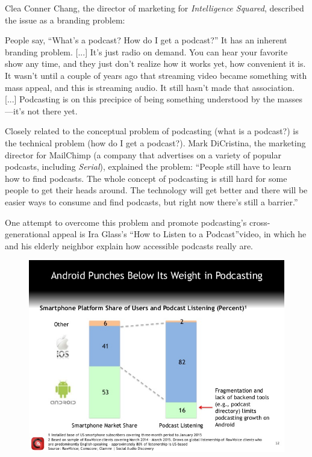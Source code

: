 \documentclass[notoc, symmetric, nobib, nols]{towcenter-guideto-book}
\begin{document}
Clea Conner Chang, the director of marketing for \textit{Intelligence Squared}, described the issue as a branding problem: 

People say, ``What's a podcast? How do I get a podcast?'' It has an inherent branding problem. [...] It's just radio on demand. You can hear your favorite show any time, and they just don't realize how it works yet, how convenient it is. It wasn't until a couple of years ago that streaming video became something with mass appeal, and this is streaming audio. It still hasn't made that association. [...] Podcasting is on this precipice of being something understood by the masses---it's not there yet.\autocite{chang} 

Closely related to the conceptual problem of podcasting (what is a podcast?) is the technical problem (how do I get a podcast?). Mark DiCristina, the marketing director for MailChimp (a company that advertises on a variety of popular podcasts, including \textit{Serial}), explained the problem: ``People still have to learn how to find podcasts. The whole concept of podcasting is still hard for some people to get their heads around. The technology will get better and there will be easier ways to consume and find podcasts, but right now there's still a barrier.''\autocite{mailchimp} 

One attempt to overcome this problem and promote podcasting's cross-generational appeal is Ira Glass's ``How to Listen to a Podcast''video, in which he and his elderly neighbor explain how accessible podcasts really are.\autocite{iramary} 

\begin{figure}
\begin{centering}
\includegraphics[width=.9\textwidth]{graphics/PODCAST15_clammrfuture_android.jpg}
\caption{}
\end{centering}
\end{figure}
\end{document}
